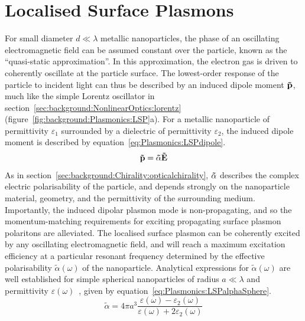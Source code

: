 \section{Localised Surface Plasmons}\label{sec:background:Plasmonics:LSP}

For small diameter $d \ll \lambda$ metallic nanoparticles, the phase of an oscillating electromagnetic field can be assumed constant over the particle, known as the ``quasi-static approximation''. In this approximation, the electron gas is driven to coherently oscillate at the particle surface. The lowest-order response of the particle to incident light can thus be described by an induced dipole moment $\bf{\tilde p}$, much like the simple Lorentz oscillator in section~\ref{sec:background:NonlinearOptics:lorentz} (figure~\ref{fig:background:Plasmonics:LSP}a).
For a metallic nanoparticle of permittivity $\varepsilon_1$ surrounded by a dielectric of permittivity $\varepsilon_2$, the induced dipole moment is described by equation~\ref{eq:Plasmonics:LSPdipole}. 
\begin{equation}\label{eq:Plasmonics:LSPdipole}
    {\bf{\tilde p}} = {\bf{\tilde \alpha }}{\bf{\tilde E}}
\end{equation}
As in section~\ref{sec:background:Chirality:opticalchirality}, $\bf{\tilde \alpha }$ describes the complex electric polarisability of the particle, and depends strongly on the nanoparticle material, geometry, and the permittivity of the surrounding medium.
Importantly, the induced dipolar plasmon mode is non-propagating, and so the momentum-matching requirements for exciting propagating surface plasmon polaritons are alleviated. The localised surface plasmon can be coherently excited by any oscillating electromagnetic field, and will reach a maximum excitation efficiency at a particular resonant frequency determined by the effective polarisability ${\tilde \alpha }(\omega)$ of the nanoparticle.
Analytical expressions for ${\tilde \alpha }(\omega)$ are well established for simple spherical nanoparticles of radius $a \ll \lambda$ and permittivity $\varepsilon(\omega)$~\cite{Maier2007, Collins2017}, given by equation~\ref{eq:Plasmonics:LSPalphaSphere}. 
\begin{equation}\label{eq:Plasmonics:LSPalphaSphere}
    {\tilde \alpha } = 4\pi a^3 \frac{\varepsilon (\omega) - \varepsilon_2 (\omega)}{\varepsilon (\omega) + 2\varepsilon_2 (\omega)}
\end{equation}
